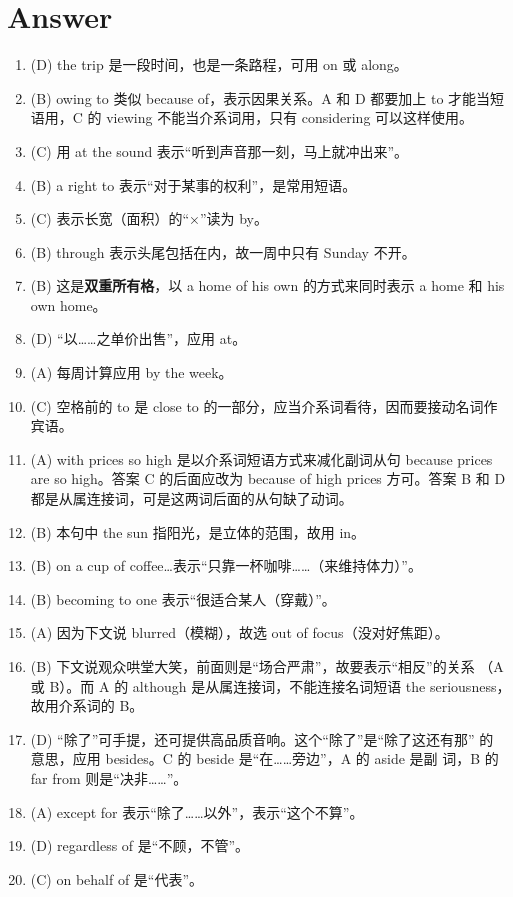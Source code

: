 \documentclass{yufa}
\begin{document}
\section{Answer}
\begin{enumerate}
\item (D) the trip 是一段时间，也是一条路程，可用 on 或 along。

\item (B) owing to 类似 because of，表示因果关系。A 和 D 都要加上 to 才能当短语用，C 的 viewing 不能当介系词用，只有 considering 可以这样使用。

\item (C) 用 at the sound 表示“听到声音那一刻，马上就冲出来”。


\item  (B) a right to 表示“对于某事的权利”，是常用短语。

\item  (C) 表示长宽（面积）的“×”读为 by。

\item  (B) through 表示头尾包括在内，故一周中只有 Sunday 不开。

\item (B) 这是\textbf{双重所有格}，以 a home of his own 的方式来同时表示 a
  home 和 his own home。

\item  (D) “以……之单价出售”，应用 at。

\item  (A) 每周计算应用 by the week。

\item (C) 空格前的 to 是 close to 的一部分，应当介系词看待，因而要接动名词作宾语。

\item (A) with prices so high 是以介系词短语方式来减化副词从句 because prices
  are so high。答案 C 的后面应改为 because of high prices 方可。答案 B 和 D
  都是从属连接词，可是这两词后面的从句缺了动词。

\item (B) 本句中 the sun 指阳光，是立体的范围，故用 in。
\item (B) on a cup of coffee…表示“只靠一杯咖啡……（来维持体力）”。
\item (B) becoming to one 表示“很适合某人（穿戴）”。

\item  (A) 因为下文说 blurred（模糊），故选 out of focus（没对好焦距）。
\item (B) 下文说观众哄堂大笑，前面则是“场合严肃”，故要表示“相反”的关系
  （A 或 B）。而 A 的 although 是从属连接词，不能连接名词短语 the
  seriousness，故用介系词的 B。

\item (D) “除了”可手提，还可提供高品质音响。这个“除了”是“除了这还有那” 的
  意思，应用 besides。C 的 beside 是“在……旁边”，A 的 aside 是副
  词，B 的 far from 则是“决非……”。

\item (A) except for 表示“除了……以外”，表示“这个不算”。
\item (D) regardless of 是“不顾，不管”。
\item  (C) on behalf of 是“代表”。

\end{enumerate}
\end{document}

